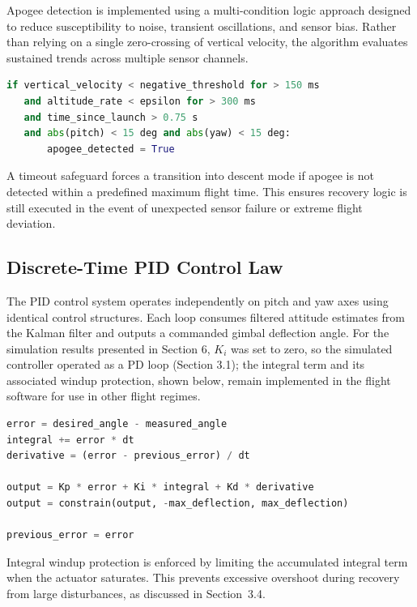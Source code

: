 Apogee detection is implemented using a multi-condition logic approach designed to reduce
susceptibility to noise, transient oscillations, and sensor bias. Rather than relying on a single
zero-crossing of vertical velocity, the algorithm evaluates sustained trends across multiple sensor
channels.

\begin{lstlisting}[language=Python, caption={Multi-condition apogee detection algorithm.},
                   label=lst:apogee]
if vertical_velocity < negative_threshold for > 150 ms
   and altitude_rate < epsilon for > 300 ms
   and time_since_launch > 0.75 s
   and abs(pitch) < 15 deg and abs(yaw) < 15 deg:
       apogee_detected = True
\end{lstlisting}

A timeout safeguard forces a transition into descent mode if apogee is not detected within a
predefined maximum flight time. This ensures recovery logic is still executed in the event of
unexpected sensor failure or extreme flight deviation.

\subsection{Discrete-Time PID Control Law}
\label{subsec:app_pid}

The PID control system operates independently on pitch and yaw axes using identical control structures. Each loop consumes filtered attitude estimates from the Kalman filter and outputs a commanded gimbal deflection angle. For the simulation results presented in Section 6, $K_i$ was set to zero, so the simulated controller operated as a PD loop (Section 3.1); the integral term and its associated windup protection, shown below, remain implemented in the flight software for use in other flight regimes.

\begin{lstlisting}[language=Python, caption={Discrete-time PID update law implemented on the flight computer.},
                   label=lst:pid]
error = desired_angle - measured_angle
integral += error * dt
derivative = (error - previous_error) / dt

output = Kp * error + Ki * integral + Kd * derivative
output = constrain(output, -max_deflection, max_deflection)

previous_error = error
\end{lstlisting}

Integral windup protection is enforced by limiting the accumulated integral term when the actuator
saturates. This prevents excessive overshoot during recovery from large disturbances, as discussed
in Section~3.4.

